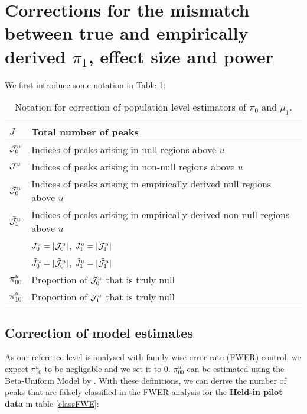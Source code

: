 \section{Corrections for the mismatch between true and empirically derived $\pi_1$, effect size and power \label{App.corrections}}

We first introduce some notation in Table \ref{notation}:\\

\renewcommand{\arraystretch}{0.8}%
\begin{table}[H]
  \begin{center}
    \begin{tabular}{ll}
      \toprule
    $J$ & Total number of peaks \\
    \midrule
    ${\cal J}_0^u$ & Indices of peaks arising in null regions above $u$ \\
    ${\cal J}_1^u$ & Indices of peaks arising in non-null regions above $u$ \\
    $\tilde{\cal J}_0^u$ & Indices of peaks arising in empirically derived null regions above $u$ \\
    $\tilde{\cal J}_1^u$ & Indices of peaks arising in empirically derived non-null regions above $u$ \\
     & $J_0^u = |{\cal J}_0^u|$, $J_1^u = |{\cal J}_1^u|$\\
     & $\tilde{J}_0^u = |\tilde{\cal J}_0^u|$, $\tilde{J}_1^u = |\tilde{\cal J}_1^u|$\\
     \midrule
    $\pi_{00}^u$ & Proportion of $\tilde{\cal J}_0^u$ that is truly null \\
    $\pi_{10}^u$ & Proportion of $\tilde{\cal J}_1^u$ that is truly null \\
    \bottomrule
    \end{tabular}
    \caption{Notation for correction of population level estimators of $\pi_0$ and $\mu_1$. \label{notation}}
\end{center}
\end{table}

\subsection{Correction of model estimates}

As our reference level is analysed with family-wise error rate (FWER) control, we expect $\pi_{10}^u$ to be negligable and we set it to 0. $\pi_{00}^u$ can be estimated using the Beta-Uniform Model by \citet{Pounds2003}.  With these definitions, we can derive the number of peaks that are falsely classified in the FWER-analysis for the \textbf{Held-in pilot data} in table \ref{classFWE}:\\


